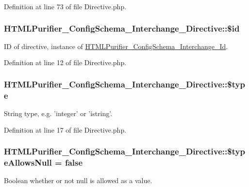 Definition at line 73 of file Directive.\+php.

\hypertarget{classHTMLPurifier__ConfigSchema__Interchange__Directive_a1e4055feb63312cee8eccf13bd6ffd7c}{
\subsubsection[{\$id}]{\setlength{\rightskip}{0pt plus 5cm}H\+T\+M\+L\+Purifier\+\_\+\+Config\+Schema\+\_\+\+Interchange\+\_\+\+Directive\+::\$id}}\label{classHTMLPurifier__ConfigSchema__Interchange__Directive_a1e4055feb63312cee8eccf13bd6ffd7c}
I\+D of directive, instance of \hyperlink{classHTMLPurifier__ConfigSchema__Interchange__Id}{H\+T\+M\+L\+Purifier\+\_\+\+Config\+Schema\+\_\+\+Interchange\+\_\+\+Id}. 

Definition at line 12 of file Directive.\+php.

\hypertarget{classHTMLPurifier__ConfigSchema__Interchange__Directive_a1653790e5969bbf12bd9094ce9949a77}{
\subsubsection[{\$type}]{\setlength{\rightskip}{0pt plus 5cm}H\+T\+M\+L\+Purifier\+\_\+\+Config\+Schema\+\_\+\+Interchange\+\_\+\+Directive\+::\$type}}\label{classHTMLPurifier__ConfigSchema__Interchange__Directive_a1653790e5969bbf12bd9094ce9949a77}
String type, e.\+g. 'integer' or 'istring'. 

Definition at line 17 of file Directive.\+php.

\hypertarget{classHTMLPurifier__ConfigSchema__Interchange__Directive_a4ebab550b459e3460d32dda71e7bfdba}{
\subsubsection[{\$type\+Allows\+Null}]{\setlength{\rightskip}{0pt plus 5cm}H\+T\+M\+L\+Purifier\+\_\+\+Config\+Schema\+\_\+\+Interchange\+\_\+\+Directive\+::\$type\+Allows\+Null = false}}\label{classHTMLPurifier__ConfigSchema__Interchange__Directive_a4ebab550b459e3460d32dda71e7bfdba}
Boolean whether or not null is allowed as a value. 

